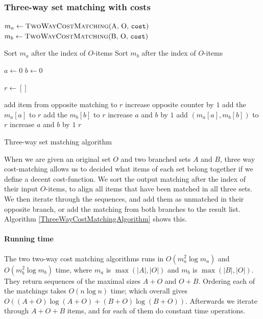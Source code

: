 \documentclass[11pt]{article}
\begin{document}
\subsubsection{Three-way set matching with costs}

\begin{algorithm}
\begin{algorithmic}
	\State $m_a\gets \Call{TwoWayCostMatching}{$A, O, $\texttt{cost}}$
	\State $m_b\gets \Call{TwoWayCostMatching}{$B, O, $\texttt{cost}}$
	
	\State Sort $m_a$ after the index of $O$-items
	\State Sort $m_b$ after the index of $O$-items

	\State $a \gets 0$
	\State $b \gets 0$
	
	\State $r \gets []$
	
			\State add item from opposite matching to $r$
			\State increase opposite counter by $1$
			\State add the $m_a[a]$ to $r$
			\State add the $m_b[b]$ to $r$
			\State increase $a$ and $b$ by $1$
		\Else
			\State add $(m_a[a], m_b[b])$ to $r$
			\State increase $a$ and $b$ by $1$
		\EndIf
	\EndWhile
	\State \Return $r$
\EndFunction
\end{algorithmic}
\caption{Three-way set matching algorithm}
  \label{ThreeWayCostMatchingAlgorithm}
\end{algorithm}

When we are given an original set $O$ and two branched sets $A$ and $B$, three way cost-matching allows us to decided what items of each set belong together if we define a decent cost-function. We sort the output matching after the index of their input $O$-items, to align all items that have been matched in all three sets. We then iterate through the sequences, and add them as unmatched in their opposite branch, or add the matching from both branches to the result list. Algorithm \ref{ThreeWayCostMatchingAlgorithm} shows this.

\paragraph{Running time} The two two-way cost matching algorithms runs in $O(m_{a}^2 \log m_{a})$ and $O(m_{b}^2 \log m_{b})$ time, where $m_{a}$ is $\max(|A|, |O|)$ and $m_{b}$ is $\max(|B|, |O|)$. They return sequences of the maximal sizes $A+O$ and $O+B$. Ordering each of the matchings takes $O(n \log n)$ time; which overall gives $O((A+O) \log (A+O) + (B+O) \log (B+O))$. Afterwards we iterate through $A+O+B$ items, and for each of them do constant time operations.
\end{document}
